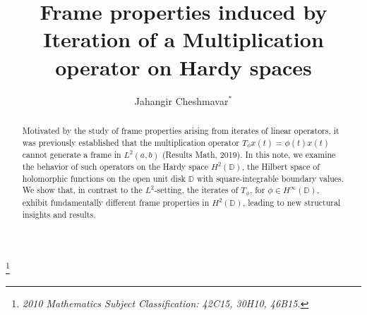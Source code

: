 \documentclass[12pt,titlepage]{amsart}
\theoremstyle{definition}
\theoremstyle{remark}
\begin{document}
\title[Iteration of a Multiplication
operator] {Frame properties induced by Iteration of a
Multiplication operator on Hardy spaces}

\author{Jahangir Cheshmavar$^*$}

\address{Department of Mathematics,
Payame Noor University, P.O.Box: 19395-4697, Tehran, Iran \\
\emph{j$_{_-}$cheshmavar@pnu.ac.ir}\\
}

\thanks{\it 2010 Mathematics Subject Classification: 42C15,
30H10, 46B15.}

 \dedicatory{} \commby{}
\begin{abstract}
Motivated by the study of frame properties arising from iterates
of linear operators, it was previously established that the
multiplication operator $T_{\phi}x(t)=\phi(t)x(t)$ cannot generate
a frame in $L^2(a,b)$ (Results Math, 2019). In this note, we
examine the behavior of such operators on the Hardy space
$H^2(\mathbb{D})$, the Hilbert space of holomorphic functions on
the open unit disk $\mathbb{D}$ with square-integrable boundary
values. We show that, in contrast to the $L^2$-setting, the
iterates of $T_\phi$, for $\phi \in H^\infty(\mathbb{D})$, exhibit
fundamentally different frame properties in $H^2(\mathbb{D})$,
leading to new structural insights and results.
\end{abstract}
\maketitle

\end{document}
